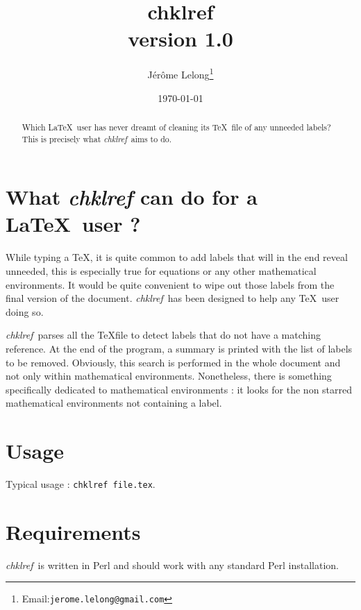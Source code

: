 \documentclass[a4paper,11pt,twoside]{article}
\title{chklref\\
{\large version 1.0}}
\date{\today}
\author{J\'er\^ome Lelong\footnote{Email:\texttt{jerome.lelong@gmail.com}}}
\def\chk{{\it chklref}}
\begin{document}
\maketitle

\begin{abstract}
  Which \LaTeX\ user has never dreamt of cleaning its \TeX\ file of any
  unneeded labels? This is precisely what \chk\ aims to do. 
\end{abstract}

\section{What {\it chklref} can do for a \LaTeX\ user ?}

While typing a \TeX, it is quite common to add labels that will in the end
reveal unneeded, this is especially true for equations or any other mathematical
environments. It would be quite convenient to wipe out those labels from the
final version of the document. \chk\ has been designed to help any \TeX\
user doing so.

\chk\ parses all the \TeX file to detect labels that do not have a matching
reference. At the end of the program, a summary is printed with the list of
labels to be removed. Obviously, this search is performed in the whole document
and not only within mathematical environments. Nonetheless, there is something
specifically dedicated to mathematical environments : it looks for the non
starred mathematical environments not containing a label.


\section{Usage}

Typical usage : \verb!chklref file.tex!.

\section{Requirements}

\chk\ is written in Perl and should work with any standard Perl installation.
\end{document}
